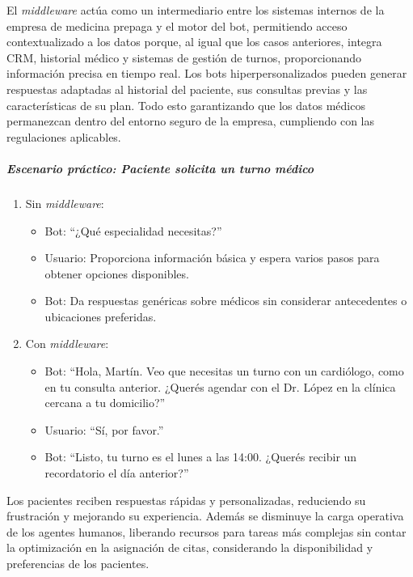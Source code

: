 El \textit{middleware} actúa como un intermediario entre los sistemas internos de la empresa de medicina prepaga y el motor del bot, permitiendo acceso contextualizado a los datos porque, al igual que los casos anteriores, integra CRM, historial médico y sistemas de gestión de turnos, proporcionando información precisa en tiempo real. Los bots hiperpersonalizados pueden generar respuestas adaptadas al historial del paciente, sus consultas previas y las características de su plan. Todo esto garantizando que los datos médicos permanezcan dentro del entorno seguro de la empresa, cumpliendo con las regulaciones aplicables.

\subparagraph{Escenario práctico: Paciente solicita un turno médico}

\begin{enumerate}
    \item Sin \textit{middleware}:
    \begin{itemize}
        \item Bot: ``¿Qué especialidad necesitas?''
        \item Usuario: Proporciona información básica y espera varios pasos para obtener opciones disponibles.
        \item Bot: Da respuestas genéricas sobre médicos sin considerar antecedentes o ubicaciones preferidas.
    \end{itemize}
    
    \item Con \textit{middleware}:
    \begin{itemize}
        \item Bot: ``Hola, Martín. Veo que necesitas un turno con un cardiólogo, como en tu consulta anterior. ¿Querés agendar con el Dr. López en la clínica cercana a tu domicilio?''
        \item Usuario: ``Sí, por favor.''
        \item Bot: ``Listo, tu turno es el lunes a las 14:00. ¿Querés recibir un recordatorio el día anterior?''
    \end{itemize}
\end{enumerate}

Los pacientes reciben respuestas rápidas y personalizadas, reduciendo su frustración y mejorando su experiencia. Además se disminuye la carga operativa de los agentes humanos, liberando recursos para tareas más complejas sin contar la optimización en la asignación de citas, considerando la disponibilidad y preferencias de los pacientes.